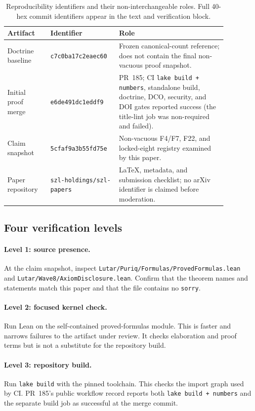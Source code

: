 \documentclass[11pt,letterpaper]{article}
\theoremstyle{definition}
\begin{document}
\begin{table}[t]
\centering
\small
\begin{tabular}{@{}p{0.18\linewidth}p{0.25\linewidth}p{0.45\linewidth}@{}}
\toprule
Artifact & Identifier & Role \\
\midrule
Doctrine baseline & \texttt{c7c0ba17c2eaec60} & Frozen canonical-count
reference; does not contain the final non-vacuous proof snapshot. \\
Initial proof merge & \texttt{e6de491dc1eddf9} & PR~185; CI \texttt{lake
build + numbers}, standalone build, doctrine, DCO, security, and DOI gates
reported success (the title-lint job was non-required and failed). \\
Claim snapshot & \texttt{5cfaf9a3b55fd75e} & Non-vacuous F4/F7, F22, and
locked-eight registry examined by this paper. \\
Paper repository & \nolinkurl{szl-holdings/szl-papers} & LaTeX, metadata, and
submission checklist; no arXiv identifier is claimed before moderation. \\
\bottomrule
\end{tabular}
\caption{Reproducibility identifiers and their non-interchangeable roles. Full
40-hex commit identifiers appear in the text and verification block.}
\label{tab:artifacts}
\end{table}

\subsection{Four verification levels}

\paragraph{Level 1: source presence.} At the claim snapshot, inspect
\nolinkurl{Lutar/Puriq/Formulas/ProvedFormulas.lean} and
\nolinkurl{Lutar/Wave8/AxiomDisclosure.lean}. Confirm that the theorem names and
statements match this paper and that the file contains no \texttt{sorry}.

\paragraph{Level 2: focused kernel check.} Run Lean on the self-contained
proved-formulas module. This is faster and narrows failures to the artifact
under review. It checks elaboration and proof terms but is not a substitute for
the repository build.

\paragraph{Level 3: repository build.} Run \texttt{lake build} with the pinned
toolchain. This checks the import graph used by CI. PR~185's public workflow
record reports both \texttt{lake build + numbers} and the separate build job as
successful at the merge commit.
\end{document}
